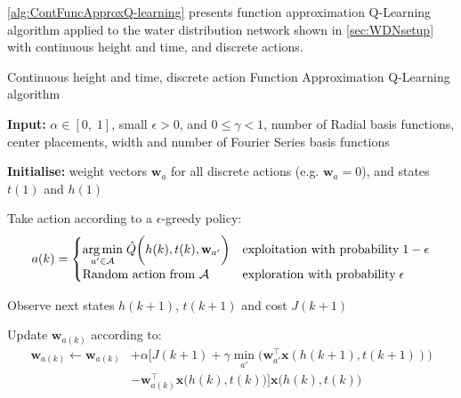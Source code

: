 \cref{alg:ContFuncApproxQ-learning} presents function approximation Q-Learning algorithm applied to the water distribution network shown in \cref{sec:WDNsetup} with continuous height and time, and discrete actions.

\begin{algorithm}
	\caption{Continuous height and time, discrete action Function Approximation Q-Learning algorithm}
	\label{alg:ContFuncApproxQ-learning}
	\begin{algorithmic}[1]
		\State \textbf{Input:} $\alpha\in[0,\;1]$, small $\epsilon>0$, and $0\leq\gamma < 1$, number of Radial basis functions, center placements, width and number of Fourier Series basis functions
				
		\State \textbf{Initialise:}  weight vectors $ \textbf{w}_{a} $ for all discrete actions (e.g. $ \textbf{w}_{a}=0 $), and states $ t(1) $ and $ h(1) $ 
		
		
		\State Take action according to a $\epsilon$-greedy policy:
		\begin{equation*}
			a(k) = \begin{cases} 
				\underset{a'\in \mathcal{A}}{\arg\min} \; \hat{Q}\bigg(h(k),t(k),\textbf{w}_{a'}\bigg) & \text{exploitation with probability} \; 1-\epsilon  \\
				\text{Random action from $ \mathcal{A} $} & \text{exploration with probability} \; \epsilon 
			\end{cases}
		\end{equation*}
		
		\State Observe next states $ h(k+1) $, $ t(k+1) $ and cost $ J(k+1) $
		
		\State Update $ \textbf{w}_{a(k)} $ according to:
	\begin{equation*}
		\begin{split}
			\textbf{w}_{a(k)} \leftarrow \textbf{w}_{a(k)}
			&+\alpha\bigg[J(k+1)+\gamma\min_{a'}\bigg(\textbf{w}_{a'}^{\intercal}\textbf{x}(h(k+1),t(k+1))\bigg)\\
			&-\textbf{w}_{a(k)}^{\intercal}\textbf{x}\bigg(h(k),t(k)\bigg)
			\bigg]\textbf{x}\bigg(h(k),t(k)\bigg)
		\end{split}
	\end{equation*}
		\EndFor
	\end{algorithmic}
\end{algorithm}

\clearpage


